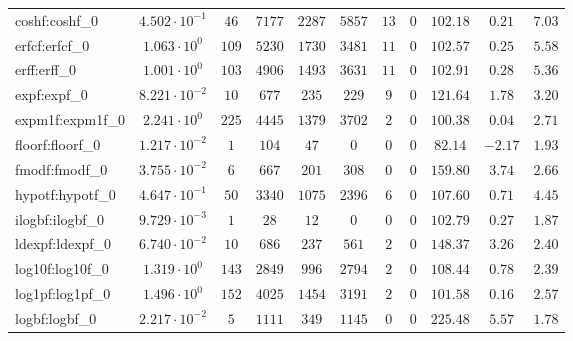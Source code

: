 \begin{tabular}{|l|c|c|c|c|c|c|c|c|c|c|}
coshf:coshf\_0               & $ 4.502 \cdot 10^{-1} $ & $ 46     $ & $ 7177   $ & $ 2287  $ & $ 5857  $ & $ 13  $ & $ 0 $ & $ 102.18      $ & $ 0.21    $ & $ 7.03    $ \\
erfcf:erfcf\_0               & $ 1.063 \cdot 10^{0}  $ & $ 109    $ & $ 5230   $ & $ 1730  $ & $ 3481  $ & $ 11  $ & $ 0 $ & $ 102.57      $ & $ 0.25    $ & $ 5.58    $ \\
erff:erff\_0                 & $ 1.001 \cdot 10^{0}  $ & $ 103    $ & $ 4906   $ & $ 1493  $ & $ 3631  $ & $ 11  $ & $ 0 $ & $ 102.91      $ & $ 0.28    $ & $ 5.36    $ \\
expf:expf\_0                 & $ 8.221 \cdot 10^{-2} $ & $ 10     $ & $ 677    $ & $ 235   $ & $ 229   $ & $ 9   $ & $ 0 $ & $ 121.64      $ & $ 1.78    $ & $ 3.20    $ \\
expm1f:expm1f\_0             & $ 2.241 \cdot 10^{0}  $ & $ 225    $ & $ 4445   $ & $ 1379  $ & $ 3702  $ & $ 2   $ & $ 0 $ & $ 100.38      $ & $ 0.04    $ & $ 2.71    $ \\
floorf:floorf\_0             & $ 1.217 \cdot 10^{-2} $ & $ 1      $ & $ 104    $ & $ 47    $ & $ 0     $ & $ 0   $ & $ 0 $ & $ 82.14       $ & $ -2.17   $ & $ 1.93    $ \\
fmodf:fmodf\_0               & $ 3.755 \cdot 10^{-2} $ & $ 6      $ & $ 667    $ & $ 201   $ & $ 308   $ & $ 0   $ & $ 0 $ & $ 159.80      $ & $ 3.74    $ & $ 2.66    $ \\
hypotf:hypotf\_0             & $ 4.647 \cdot 10^{-1} $ & $ 50     $ & $ 3340   $ & $ 1075  $ & $ 2396  $ & $ 6   $ & $ 0 $ & $ 107.60      $ & $ 0.71    $ & $ 4.45    $ \\
ilogbf:ilogbf\_0             & $ 9.729 \cdot 10^{-3} $ & $ 1      $ & $ 28     $ & $ 12    $ & $ 0     $ & $ 0   $ & $ 0 $ & $ 102.79      $ & $ 0.27    $ & $ 1.87    $ \\
ldexpf:ldexpf\_0             & $ 6.740 \cdot 10^{-2} $ & $ 10     $ & $ 686    $ & $ 237   $ & $ 561   $ & $ 2   $ & $ 0 $ & $ 148.37      $ & $ 3.26    $ & $ 2.40    $ \\
log10f:log10f\_0             & $ 1.319 \cdot 10^{0}  $ & $ 143    $ & $ 2849   $ & $ 996   $ & $ 2794  $ & $ 2   $ & $ 0 $ & $ 108.44      $ & $ 0.78    $ & $ 2.39    $ \\
log1pf:log1pf\_0             & $ 1.496 \cdot 10^{0}  $ & $ 152    $ & $ 4025   $ & $ 1454  $ & $ 3191  $ & $ 2   $ & $ 0 $ & $ 101.58      $ & $ 0.16    $ & $ 2.57    $ \\
logbf:logbf\_0               & $ 2.217 \cdot 10^{-2} $ & $ 5      $ & $ 1111   $ & $ 349   $ & $ 1145  $ & $ 0   $ & $ 0 $ & $ 225.48      $ & $ 5.57    $ & $ 1.78    $ \\

\end{tabular}
